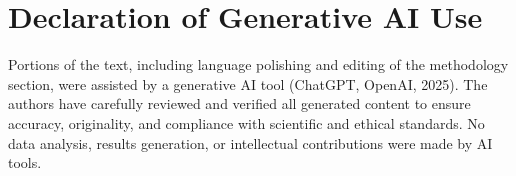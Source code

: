 \documentclass[final,3p,times,review,sort&compress]{elsarticle}
\begin{document}
\section*{Declaration of Generative AI Use}
Portions of the text, including language polishing and editing of the methodology section, were assisted by a generative AI tool (ChatGPT, OpenAI, 2025). The authors have carefully reviewed and verified all generated content to ensure accuracy, originality, and compliance with scientific and ethical standards. No data analysis, results generation, or intellectual contributions were made by AI tools.




\end{document}
